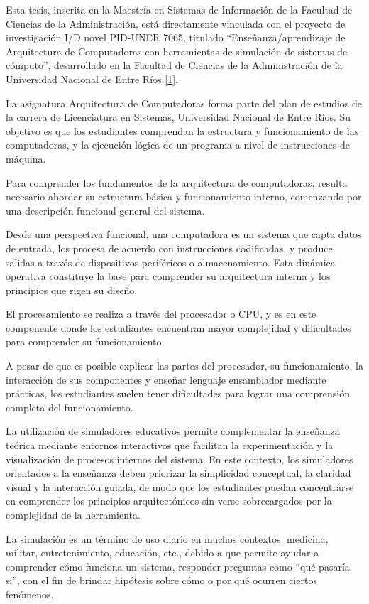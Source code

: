 \documentclass[12pt,oneside]{templates/unerthesis}
\begin{document}
Esta tesis, inscrita en la Maestría en Sistemas de Información de la Facultad de Ciencias de la Administración, está directamente vinculada con el proyecto de investigación I/D novel PID-UNER 7065, titulado ``Enseñanza/aprendizaje de Arquitectura de Computadoras con herramientas de simulación de sistemas de cómputo'', desarrollado en la Facultad de Ciencias de la Administración de la Universidad Nacional de Entre Ríos \protect\hyperlink{ref-colombani_pid_2022}{{[}1{]}}.

La asignatura Arquitectura de Computadoras forma parte del plan de estudios de la carrera de Licenciatura en Sistemas, Universidad Nacional de Entre Ríos. Su objetivo es que los estudiantes comprendan la estructura y funcionamiento de las computadoras, y la ejecución lógica de un programa a nivel de instrucciones de máquina.

Para comprender los fundamentos de la arquitectura de computadoras, resulta necesario abordar su estructura básica y funcionamiento interno, comenzando por una descripción funcional general del sistema.

Desde una perspectiva funcional, una computadora es un sistema que capta datos de entrada, los procesa de acuerdo con instrucciones codificadas, y produce salidas a través de dispositivos periféricos o almacenamiento. Esta dinámica operativa constituye la base para comprender su arquitectura interna y los principios que rigen su diseño.

El procesamiento se realiza a través del procesador o CPU, y es en este componente donde los estudiantes encuentran mayor complejidad y dificultades para comprender su funcionamiento.

A pesar de que es posible explicar las partes del procesador, su funcionamiento, la interacción de sus componentes y enseñar lenguaje ensamblador mediante prácticas, los estudiantes suelen tener dificultades para lograr una comprensión completa del funcionamiento.

La utilización de simuladores educativos permite complementar la enseñanza teórica mediante entornos interactivos que facilitan la experimentación y la visualización de procesos internos del sistema. En este contexto, los simuladores orientados a la enseñanza deben priorizar la simplicidad conceptual, la claridad visual y la interacción guiada, de modo que los estudiantes puedan concentrarse en comprender los principios arquitectónicos sin verse sobrecargados por la complejidad de la herramienta.

La simulación es un término de uso diario en muchos contextos: medicina, militar, entretenimiento, educación, etc., debido a que permite ayudar a comprender cómo funciona un sistema, responder preguntas como ``qué pasaría si'', con el fin de brindar hipótesis sobre cómo o por qué ocurren ciertos fenómenos.
\end{document}
